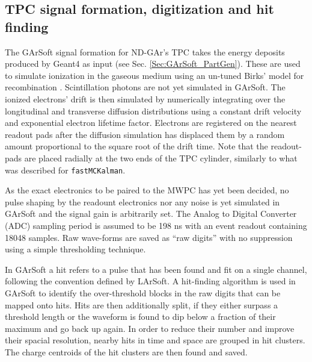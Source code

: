 \subsection{TPC signal formation, digitization and hit finding}
\label{GArSoft_signal}
The GArSoft signal formation for ND-GAr's TPC takes the energy deposits produced by Geant4 as input (see Sec. \ref{Sec:GArSoft_PartGen}). These are used to simulate ionization in the gaseous medium using an un-tuned Birks' model for recombination \cite{Birks:1951boa}. Scintillation photons are not yet simulated in GArSoft. The ionized electrons' drift is then simulated by numerically integrating over the longitudinal and transverse diffusion distributions using a constant drift velocity and exponential electron lifetime factor. Electrons are registered on the nearest readout pads after the diffusion simulation has displaced them by a random
amount proportional to the square root of the drift time. Note that the readout-pads are placed radially at the two ends of the TPC cylinder, similarly to what was described for \texttt{fastMCKalman}. 

As the exact electronics to be paired to the MWPC has yet been decided, no pulse shaping by the readount electronics nor any noise is yet simulated in GArSoft and the signal gain is arbitrarily set. The Analog to Digital Converter (ADC) sampling period is assumed to be 198 ns with an event readout containing 18048 samples. Raw wave-forms are saved as \enquote{raw digits} with no suppression using a simple thresholding technique.

In GArSoft a hit refers to a pulse that has been found and fit on a single channel, following the convention defined by LArSoft. A hit-finding algorithm is used in GArSoft to identify the over-threshold blocks in the raw digits that can be mapped onto hits. Hits are then additionally split, if they either surpass a threshold length or the waveform is found to dip below a fraction of their maximum and go back up again. In order to reduce their number and improve their spacial resolution, nearby hits in time and space are grouped in hit clusters. The charge centroids of the hit clusters are then found and saved. 

